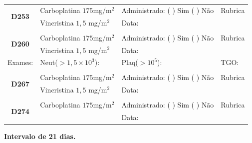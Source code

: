 \documentclass[11pt,a4paper,oldfontcommands]{memoir}
\begin{document}
\begin{center}
\begin{longtable}{p{1cm}p{4cm}|p{5cm}|p{3cm}}
    \hline
    \multicolumn{1}{c|}{\multirow{2}{*}{\textbf{D253}}}&{Carboplatina \(175\)mg/m\(^2\)}&{Administrado: (  ) Sim (  ) Não}&{Rubrica}\\
    \multicolumn{1}{c|}{}&{Vincristina \(1,5\) mg/m\(^2\)}&{Data:}&\\
    \hline
    \\
    \hline
    \multicolumn{1}{c|}{\multirow{2}{*}{\textbf{D260}}}&{Carboplatina \(175\)mg/m\(^2\)}&{Administrado: (  ) Sim (  ) Não}&{Rubrica}\\
    \multicolumn{1}{c|}{}&{Vincristina \(1,5\) mg/m\(^2\)}&{Data:}&\\
    \hline
    
    {\tiny{Exames:}}&{\tiny{Neut(\(>1,5\times10^3\)):}}&{\tiny{Plaq(\(>10^5\)):}}&{\tiny{TGO:}}
    \\
    \hline
    \\
    \hline
    \multicolumn{1}{c|}{\multirow{2}{*}{\textbf{D267}}}&{Carboplatina \(175\)mg/m\(^2\)}&{Administrado: (  ) Sim (  ) Não}&{Rubrica}\\
    \multicolumn{1}{c|}{}&{Vincristina \(1,5\) mg/m\(^2\)}&{Data:}&\\
    \hline
    \\
    \hline
    \multicolumn{1}{c|}{\multirow{2}{*}{\textbf{D274}}}&{Carboplatina \(175\)mg/m\(^2\)}&{Administrado: (  ) Sim (  ) Não}&{Rubrica}\\
	\multicolumn{1}{c|}{}&&{Data:}&\\
    \hline
\end{longtable}
\textbf{Intervalo de 21 dias.}
\end{center}
\end{document}
